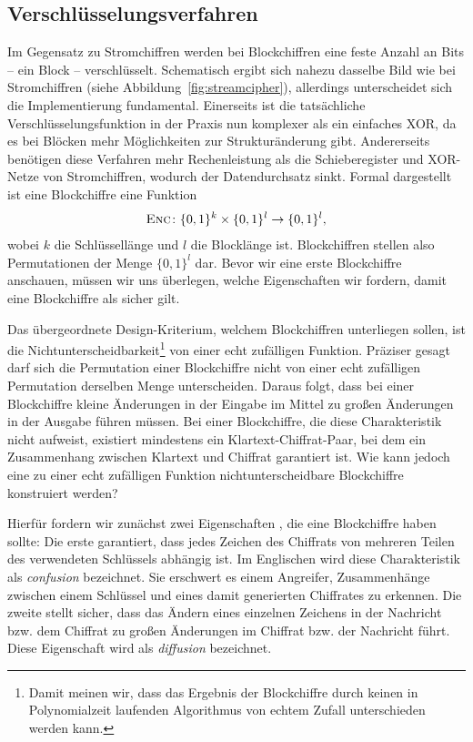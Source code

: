\subsection{Verschlüsselungsverfahren}
Im Gegensatz zu Stromchiffren werden bei Blockchiffren
 eine feste Anzahl an Bits -- ein Block --
verschlüsselt. Schematisch ergibt sich nahezu dasselbe Bild wie bei
Stromchiffren (siehe Abbildung~\ref{fig:streamcipher}), allerdings
unterscheidet sich die Implementierung fundamental. Einerseits ist die
tatsächliche Verschlüsselungsfunktion in der Praxis nun komplexer als
ein einfaches XOR, da es bei Blöcken mehr Möglichkeiten zur
Strukturänderung gibt. Andererseits benötigen diese Verfahren mehr
Rechenleistung als die Schieberegister und XOR-Netze von Stromchiffren,
wodurch der Datendurchsatz sinkt. 
Formal dargestellt ist eine Blockchiffre eine Funktion
\begin{align*}
  \textsc{Enc} \colon \{0, 1\}^k \times \{0, 1\}^l \rightarrow \{0, 1\}^l\text{,}
\end{align*}
wobei \(k\) die Schlüssellänge und \(l\) die Blocklänge
ist. Blockchiffren stellen also Permutationen der Menge  
\(\{0, 1\}^l\) dar.
Bevor wir eine erste Blockchiffre anschauen, müssen wir uns überlegen,
welche Eigenschaften wir fordern, damit eine Blockchiffre als sicher gilt.

Das übergeordnete Design-Kriterium, welchem Blockchiffren unterliegen
sollen, ist die Nichtunterscheidbarkeit\footnote{Damit meinen wir, dass
  das Ergebnis der Blockchiffre durch keinen in Polynomialzeit laufenden
  Algorithmus von echtem Zufall unterschieden werden kann.} von einer
echt zufälligen Funktion. Präziser gesagt darf sich die Permutation
einer Blockchiffre nicht von einer echt zufälligen Permutation derselben
Menge unterscheiden. Daraus folgt, dass bei einer Blockchiffre kleine
Änderungen in der Eingabe im Mittel zu großen Änderungen in der Ausgabe
führen müssen. Bei einer Blockchiffre, die diese Charakteristik nicht
aufweist, existiert mindestens ein Klartext-Chiffrat-Paar, bei dem ein
Zusammenhang zwischen Klartext und Chiffrat garantiert ist. Wie kann
jedoch eine zu einer echt zufälligen Funktion nichtunterscheidbare
Blockchiffre konstruiert werden? 

Hierfür fordern wir zunächst zwei Eigenschaften \cite{Shannon1949}, die
eine Blockchiffre haben sollte: Die erste garantiert, dass jedes Zeichen
des Chiffrats von mehreren Teilen des verwendeten Schlüssels abhängig
ist. Im Englischen wird diese Charakteristik als \emph{confusion}
\indexConfusion bezeichnet. Sie erschwert es einem Angreifer,
Zusammenhänge zwischen einem Schlüssel und eines damit generierten
Chiffrates zu erkennen.  Die zweite stellt sicher, dass das Ändern eines
einzelnen Zeichens in der Nachricht bzw. dem Chiffrat zu großen
Änderungen im Chiffrat bzw. der Nachricht führt. Diese Eigenschaft wird
als \emph{diffusion} \indexDiffusion bezeichnet.

